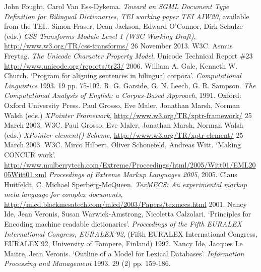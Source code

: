 \begin{bibitemlist}{1}
\label{DI-BIBL-3}John Fought, Carol Van Ess-Dykema. \textit{Toward an SGML Document Type Definition for Bilingual Dictionaries}, \textit{TEI working paper TEI AIW20}, available from the TEI.. 
\label{CSSTM}Simon Fraser, Dean Jackson, Edward O'Connor, Dirk Schulze (eds.) \textit{CSS Transforms Module Level 1 (W3C Working Draft)},  \url{http://www.w3.org/TR/css-transforms/} 26 November 2013. W3C. 
\label{CH-eg-02}Asmus Freytag. \textit{The Unicode Character Property Model}, Unicode Technical Report \#23  \url{http://www.unicode.org/reports/tr23/} 2006. 
\label{SA-BIBL-1}William A. Gale, Kenneth W. Church. ‘Program for aligning sentences in bilingual corpora’. \textit{Computational Linguistics} 1993. 19 pp. 75-102. 
\label{AI-BIBL-7}R. G. Garside, G. N. Leech, G. R. Sampson. \textit{The Computational Analysis of English: a Corpus-Based Approach}, 1991. Oxford: Oxford University Press. 
\label{XPTRFMWK}Paul Grosso, Eve Maler, Jonathan Marsh, Norman Walsh (eds.) \textit{XPointer Framework},  \url{http://www.w3.org/TR/xptr-framework/} 25 March 2003. W3C. 
\label{XPTRELEM}Paul Grosso, Eve Maler, Jonathan Marsh, Norman Walsh (eds.) \textit{XPointer element() Scheme},  \url{http://www.w3.org/TR/xptr-element/} 25 March 2003. W3C. 
\label{NH-BIBL-2}Mirco Hilbert, Oliver Schonefeld, Andreas Witt. ‘Making CONCUR work’.  \url{http://www.mulberrytech.com/Extreme/Proceedings/html/2005/Witt01/EML2005Witt01.xml} \textit{Proceedings of Extreme Markup Languages 2005}, 2005. 
\label{NH-BIBL-8}Claus Huitfeldt, C. Michael Sperberg-McQueen. \textit{TexMECS: An experimental markup meta-language for complex documents},  \url{http://mlcd.blackmesatech.com/mlcd/2003/Papers/texmecs.html} 2001. 
\label{DI-BIBL-6}Nancy Ide, Jean Veronis, Susan Warwick-Amstrong, Nicoletta Calzolari. ‘Principles for Encoding machine readable dictionaries’. \textit{Proceedings of the Fifth EURALEX International Congress, EURALEX'92},  (Fifth EURALEX International Congress, EURALEX'92, University of Tampere, Finland) 1992. 
\label{DI-BIBL-5}Nancy Ide, Jacques Le Maitre, Jean Veronis. ‘Outline of a Model for Lexical Databases’. \textit{Information Processing and Management} 1993. 29  (2)  pp. 159-186. 

\end{bibitemlist}
